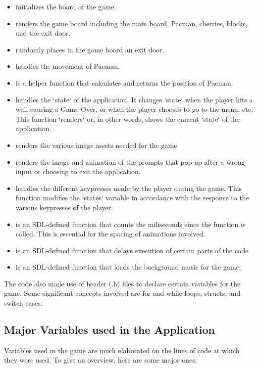\begin{itemize}[label={}]
    \item {} initializes the board of the game.
    \item {} renders the game board including the main board, Pacman, cherries, blocks, and the exit door.
    \item {} randomly places in the game board an exit door.
    \item {} handles the movement of Pacman.
    \item {} is a helper function that calculates and returns the position of Pacman.
    \item {} handles the `state` of the application. It changes `state` when the player hits a wall causing a Game Over, or when the player chooses to go to the menu, etc. This function `renders` or, in other words, shows the current `state` of the application.
    \item {} renders the various image assets needed for the game.
    \item {} renders the image and animation of the prompts that pop up after a wrong input or choosing to exit the application.
    \item {} handles the different keypresses made by the player during the game. This function modifies the `states` variable in accordance with the response to the various keypresses of the player.
    \item {} is an SDL-defined function that counts the miliseconds since the function is called. This is essential for the spacing of animations involved.
    \item {} is an SDL-defined function that delays execution of certain parts of the code.
    \item {} is an SDL-defined function that loads the background music for the game.
\end{itemize}


The code also made use of header (.h) files to declare certain variables for
the game. Some significant concepts involved are for and while loops, structs, and
switch cases.\\

\subsection{Major Variables used in the Application}
Variables used in the game are much elaborated on the lines of code at which they were used. To give an overview, here are some major ones:\\

